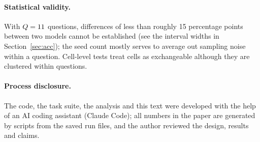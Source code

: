 \paragraph{Statistical validity.} With $Q=11{}$ questions, differences of less than roughly 15 percentage points between two models cannot be established (see the interval widths in Section~\ref{sec:acc}); the seed count mostly serves to average out sampling noise within a question. Cell-level tests treat cells as exchangeable although they are clustered within questions.
\paragraph{Process disclosure.} The code, the task suite, the analysis and this text were developed with the help of an AI coding assistant (Claude Code); all numbers in the paper are generated by scripts from the saved run files, and the author reviewed the design, results and claims.
